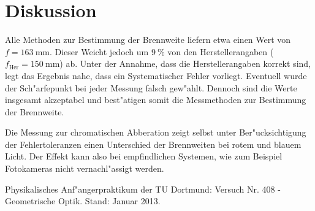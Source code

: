 \clearpage
\section{Diskussion}
	\label{sec:diskussion}
	Alle Methoden zur Bestimmung der Brennweite liefern etwa einen Wert von $f = \SI{163}{\milli \meter}$. Dieser Weicht jedoch um $\SI{9}{\percent}$ von den Herstellerangaben ($f_\mathrm{Her} = \SI{150}{\milli \meter}$) ab.
	Unter der Annahme, dass die Herstellerangaben korrekt sind, legt das Ergebnis nahe, dass ein Systematischer Fehler vorliegt.
	Eventuell wurde der Sch"arfepunkt bei jeder Messung falsch gew"ahlt.
	Dennoch sind die Werte insgesamt akzeptabel und best"atigen somit die Messmethoden zur Bestimmung der Brennweite.

	Die Messung zur chromatischen Abberation zeigt selbst unter Ber"ucksichtigung der Fehlertoleranzen einen Unterschied der Brennweiten bei rotem und blauem Licht.
	Der Effekt kann also bei empfindlichen Systemen, wie zum Beispiel Fotokameras nicht vernachl"assigt werden.

	\begin{thebibliography}{9}
	\label{sec:literaturverzeichnis}
		 Physikalisches Anf"angerpraktikum der TU Dortmund: Versuch Nr. 408 - Geometrische Optik. Stand: Januar 2013.
	\end{thebibliography}
